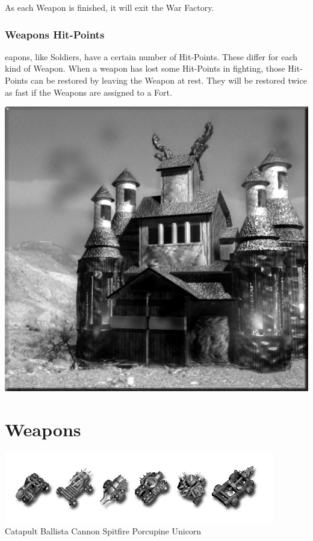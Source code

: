 As each Weapon is finished, it will exit the War Factory.

\subsubsection{Weapons Hit-Points}

eapons, like Soldiers, have a certain number of Hit-Points. These differ for each kind of Weapon. When a weapon has lost some Hit-Points in fighting, those Hit-Points can be restored by leaving the Weapon at rest. They will be restored twice as fast if the Weapons are assigned to a Fort.

\begin{center}
	\includegraphics[width=0.9\linewidth]{Awarfactory}
\end{center}

\section{Weapons}

\begin{center}
	\includegraphics[width=0.7\linewidth]{Iweapons}
	\\ Catapult Ballista Cannon Spitfire Porcupine Unicorn
\end{center}

